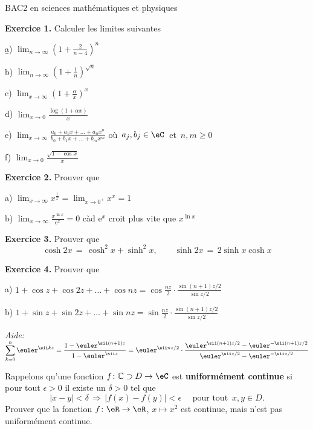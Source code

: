 \begin{bf}
	\begin{center}
		BAC2 en sciences mathématiques et physiques
	\end{center}
\end{bf}

{\bf Exercice 1.} Calculer les limites suivantes

\b
a) $\displaystyle \lim_{n \to \infty} \left( 1+ \frac{2}{n-4} \right)^n$

\medskip
b)
$\displaystyle \lim_{n \to \infty}
	\left( 1+ \frac 1n \right)^{\sqrt{n}}$

\medskip
c)  $\displaystyle \lim_{x \to \infty}
	\left( 1+ \frac \alpha x \right)^x$

\medskip
d)
$\displaystyle \lim_{x \to 0} \frac{\log \left( 1+ \alpha x \right)}{x}$


\medskip
e)
$\displaystyle \lim_{x \to \infty}
	\frac{a_0+a_1x + \dots +a_nx^n}{b_0+b_1x + \dots +b_mx^m}$
\quad où\, $a_j, b_j \in \eC$ \,et\, $n,m \ge 0$

\medskip
f)
$\displaystyle \lim_{x \to 0} \frac{\sqrt{1-\cos x}}{x}$




{\bf Exercice 2.} Prouver que

\medskip
a)
$\displaystyle \lim_{x \to \infty} x^{\frac 1x} = \lim_{x \to 0^+} x^x = 1$

\medskip
b)
$\displaystyle \lim_{x \to \infty} \frac{x^{\ln x}}{{\mathrm e}^x} =0$
\quad
càd ${\mathrm e}^x$ croit plus vite que $x^{\ln x}$


{\bf Exercice 3.} Prouver que
$$
	\cosh 2x \,=\, \cosh^2 x + \sinh^2 x,
	\qquad
	\sinh 2x \,=\, 2 \sinh x \cosh x
$$


{\bf Exercice 4.} Prouver que

a)
$1 + \cos z + \cos 2z + \dots + \cos nz = \displaystyle \cos \frac{nz}{2} \cdot \frac{\sin (n+1)z/2}{\sin z/2}$

b)
$1 + \sin z + \sin 2z + \dots + \sin nz = \displaystyle \sin \frac{nz}{2} \cdot \frac{\sin (n+1)z/2}{\sin z/2}$

{\it Aide:}\;
$\displaystyle \sum_{k=0}^n
	\euler^{\sii kz}
	=
	\frac{1-\euler^{\sii (n+1)z}}{1-\euler^{\sii z}}
	= \euler^{\sii nz/2} \cdot \frac{\euler^{\sii (n+1)z/2} - \euler^{-\sii (n+1)z/2}}{
		\euler^{\sii z/2}-\euler^{-\sii z/2}}
$

Rappelons qu'une fonction $f \colon \mathbb{C} \supset D \to \eC$ est {\bf uniformément continue} si pour tout $\epsilon >0$ il existe un \( \delta>0\) tel que
$$
	|x-y| < \delta \,\Longrightarrow\, |f(x)-f(y)| < \epsilon
	\quad \text{ pour tout }\, x,y \in D.
$$
Prouver que la fonction $f \colon \eR \to \eR$, $x \mapsto x^2$ est continue, mais n'est pas uniformément continue.


